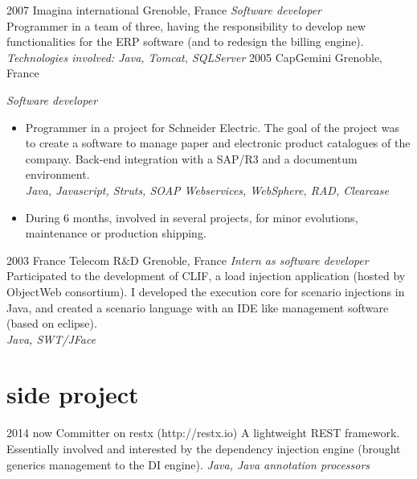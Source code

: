 \documentclass[]{k-cv} %
\begin{document}
\clearpage


\begin{entrylist}
\entry
{2007 }
{Imagina international}
{Grenoble, France}
{\emph{Software developer} \\
Programmer in a team of three, having the responsibility to develop
new functionalities for the ERP software (and to redesign the billing engine). \\
\emph{
Technologies involved:
Java, Tomcat, SQLServer
}}
\entry
{2005 }
{CapGemini}
{Grenoble, France}
{\emph{Software developer}
\begin{itemize}
\item
Programmer in a project for Schneider Electric.
The goal of the project was to create a software to manage paper and electronic product
catalogues of the company.
Back-end integration with a SAP/R3 and a documentum environment. \\
\emph{Java, Javascript, Struts, SOAP Webservices, WebSphere, RAD, Clearcase}
\item
During 6 months, involved in several projects, for minor evolutions, maintenance or production shipping.
\end{itemize}}
\entry
{2003 }
{France Telecom R\&D}
{Grenoble, France}
{\emph{Intern as software developer} \\
Participated to the development of CLIF,
a load injection application (hosted by ObjectWeb consortium).
I developed the execution core for scenario injections in Java,
and created a scenario language with an IDE like management software (based on eclipse). \\
\emph{Java, SWT/JFace}}
\end{entrylist}




\section{side project}

\begin{entrylist}
\entry
{2014 \to now}
{Committer on restx (http://restx.io)}
{}
{A lightweight REST framework.
Essentially involved and interested by the dependency injection engine (brought generics management to the DI engine).
\emph{Java, Java annotation processors}}
\end{entrylist}
\end{document}
